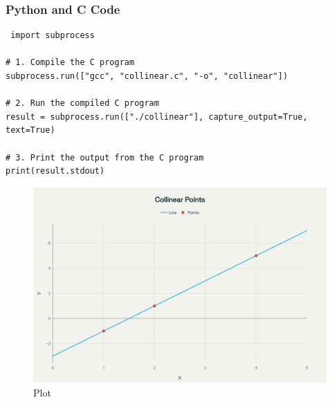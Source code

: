 \documentclass{beamer}
\begin{document}
\begin{frame}[fragile]
\frametitle{Python and C Code}

\begin{lstlisting}
 import subprocess

# 1. Compile the C program
subprocess.run(["gcc", "collinear.c", "-o", "collinear"])

# 2. Run the compiled C program
result = subprocess.run(["./collinear"], capture_output=True, text=True)

# 3. Print the output from the C program
print(result.stdout)
\end{lstlisting}

\end{frame}

 


\begin{figure}
    \centering
    \includegraphics[width=0.8\columnwidth]{Fig.png}
    \caption{Plot}
    \label{fig:placeholder}
\end{figure}
\end{document}
